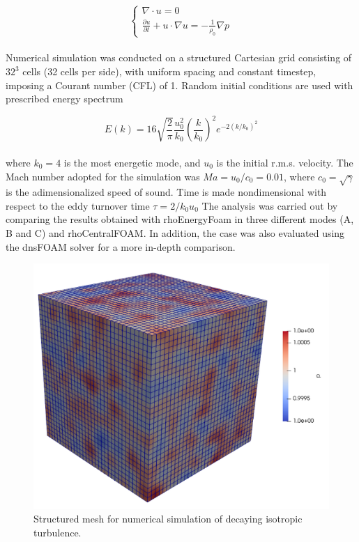 \documentclass[a5paper]{sapthesis}
\begin{document}
	\begin{equation}
		\begin{cases}
			\nabla \cdot u = 0 \\
			\frac{\partial u}{\partial t} + u \cdot \nabla u = - \frac{1}{\rho_0} \nabla p
		\end{cases}
	\end{equation}
	\\
	Numerical simulation was conducted on a structured Cartesian grid consisting of $32^3$ cells (32 cells per side), with uniform spacing and constant timestep, imposing a Courant number (CFL) of 1. Random initial conditions are used with prescribed energy spectrum
	
	\begin{equation}
		E(k) = 16 \sqrt{\frac{2}{\pi}} \frac{u_0^2}{k_0} \left( \frac{k}{k_0} \right )^2 e^{-2(k/k_0)^2}
	\end{equation}
	\\
	where $k_0 = 4$ is the most energetic mode, and $u_0$ is the initial r.m.s. velocity. The Mach number adopted for the simulation was $ Ma= u_0/c_0= 0.01$, where $c_0 = \sqrt{\gamma}$ is the adimensionalized speed of sound. Time is made nondimensional with respect to the eddy turnover time $\tau = 2/k_0 u_0$
	The analysis was carried out by comparing the results obtained with rhoEnergyFoam in three different modes (A, B and C) and rhoCentralFOAM. In addition, the case was also evaluated using the dnsFOAM solver for a more in-depth comparison.
	
	\begin{figure}[h]
		\centering
		\hspace{20mm}
		\includegraphics[width=0.6\linewidth]{Figures/DIT}
		\caption{Structured mesh for numerical simulation of decaying isotropic turbulence.}
		\label{DIT_mesh}
	\end{figure}
	
\end{document}
